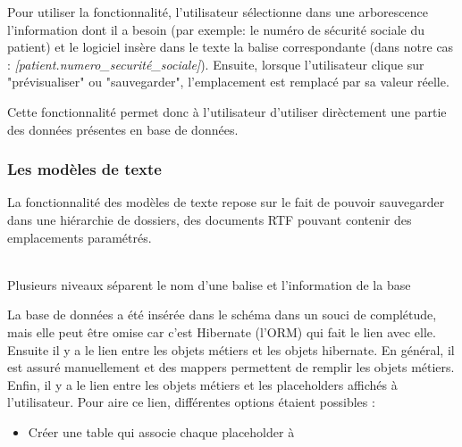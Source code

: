 Pour utiliser la fonctionnalité, l'utilisateur sélectionne dans une arborescence l'information dont il a besoin (par exemple: le numéro de sécurité sociale du patient) et le logiciel insère dans le texte la balise correspondante (dans notre cas : \textit{[patient.numero_securité_sociale]}). Ensuite, lorsque l'utilisateur clique sur "prévisualiser" ou "sauvegarder", l'emplacement est remplacé par sa valeur réelle.

Cette fonctionnalité permet donc à l'utilisateur d'utiliser dirèctement une partie des données présentes en base de données. 


\subsubsection{Les modèles de texte}
La fonctionnalité des modèles de texte repose sur le fait de pouvoir sauvegarder dans une hiérarchie de dossiers, des documents RTF pouvant contenir des emplacements paramétrés.



	

\\




Plusieurs niveaux séparent le nom d'une balise et l'information de la base 


La base de données a été insérée dans le schéma dans un souci de complétude, mais elle peut être omise car c'est Hibernate (l'ORM) qui fait le lien avec elle. \\
Ensuite il y a le lien entre les objets métiers et les objets hibernate. En général, il est assuré manuellement et des mappers permettent de remplir les objets métiers.
Enfin, il y a le lien entre les objets métiers et les placeholders affichés à l'utilisateur. Pour aire ce lien, différentes options étaient possibles : 
\begin{itemize}
\item Créer une table qui associe chaque placeholder à 
\end{itemize}
